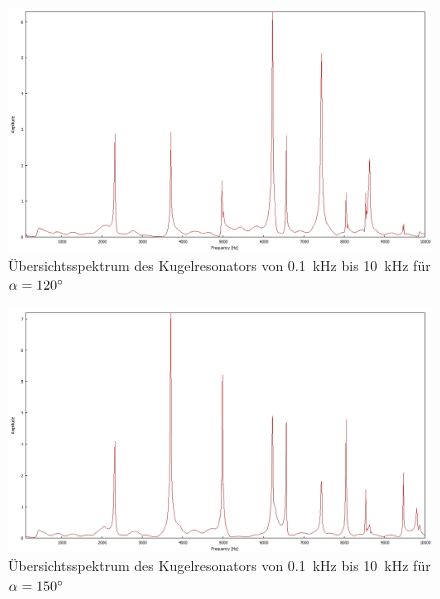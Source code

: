 \begin{figure}
\includegraphics[width=\textwidth]{content/messungen/Chapter2new/2_1_120img.jpg}
\caption{Übersichtsspektrum des Kugelresonators von 0.1~kHz bis 10~kHz für $\alpha=120\degree$}
\label{fig:2_1_120}
\end{figure}

\begin{figure}
\includegraphics[width=\textwidth]{content/messungen/Chapter2new/2_1_150img.jpg}
\caption{Übersichtsspektrum des Kugelresonators von 0.1~kHz bis 10~kHz für $\alpha=150\degree$}
\label{fig:2_1_150}
\end{figure}

